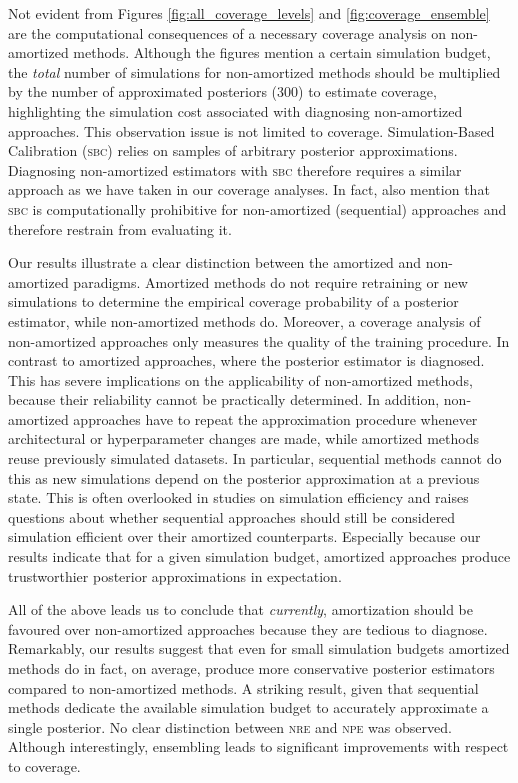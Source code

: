 \documentclass[twoside]{article}
\begin{document}
Not evident from Figures \ref{fig:all_coverage_levels} and \ref{fig:coverage_ensemble}
are the computational consequences of a necessary coverage analysis on non-amortized methods.
Although the figures mention a certain simulation budget, the \emph{total} number of simulations for non-amortized methods should be multiplied by the number of approximated posteriors (300) to estimate coverage, highlighting the simulation cost associated with diagnosing non-amortized approaches.
This observation issue is not limited to coverage. Simulation-Based Calibration (\textsc{sbc}) \citep{sbc} relies on samples of arbitrary posterior approximations.
Diagnosing non-amortized estimators with \textsc{sbc} therefore
requires a similar approach as we have taken in our coverage analyses.
In fact, \citet{lueckmann2021benchmarking} also mention that \textsc{sbc} is computationally prohibitive for non-amortized (sequential) approaches and therefore restrain from evaluating it.

Our results illustrate a clear distinction between the amortized and non-amortized paradigms. Amortized methods do not require retraining or new simulations to determine the empirical coverage probability of a posterior estimator, while non-amortized methods do.
Moreover, a coverage analysis of non-amortized approaches only measures the quality of the training procedure. In contrast to amortized approaches, where the posterior estimator is diagnosed.
This has severe
implications on the applicability of non-amortized methods, because their reliability cannot be practically determined. In addition, non-amortized approaches have to repeat the approximation procedure whenever architectural or hyperparameter changes are made, while amortized methods reuse previously simulated datasets. In particular, sequential methods cannot do this as new simulations depend on the posterior approximation at a previous state. This is often overlooked in studies on simulation efficiency and raises questions about whether sequential approaches should still be considered simulation efficient over their amortized counterparts. Especially because our results indicate that for a given simulation budget, amortized approaches produce trustworthier posterior approximations in expectation.

All of the above leads us to conclude that \emph{currently}, amortization should be favoured over non-amortized approaches because they are tedious to diagnose. Remarkably, our results suggest that even for small simulation budgets amortized methods do in fact, on average, produce more conservative posterior estimators compared to non-amortized methods.
A striking result, given that sequential methods dedicate the available simulation budget to accurately approximate a single posterior. No clear distinction between \textsc{nre} and \textsc{npe} was observed. Although interestingly, ensembling leads to significant improvements with respect to coverage.
\end{document}
